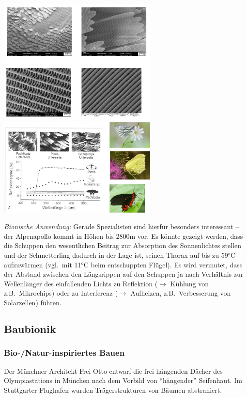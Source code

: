 \begin{center}
    \includegraphics[width=8cm]{lec7/figures/schmetterling.png}
    \hfill
    \includegraphics[width=8cm]{lec7/figures/absorption.png}
\end{center}
\textit{Bionische Anwendung:} Gerade Spezialisten sind hierfür besonders interessant -- der Alpenapollo kommt in Höhen bis 2800m vor. Es könnte gezeigt werden, dass die Schuppen den wesentlichen Beitrag zur Absorption des Sonnenlichtes stellen und der Schmetterling dadurch in der Lage ist, seinen Thorax auf bis zu 59°C aufzuwärmen (vgl.\ mit 11°C beim entschuppten Flügel). Es wird vermutet, dass der Abstand zwischen den Längsrippen auf den Schuppen ja nach Verhältnis zur Wellenlänger des einfallenden Lichts zu Reflektion ($\rightarrow$ Kühlung von z.B.\ Mikrochips) oder zu Interferenz ($\rightarrow$ Aufheizen, z.B.\ Verbesserung von Solarzellen) führen.

\subsection{Baubionik}

\subsubsection{Bio-/Natur-inspiriertes Bauen} 

Der Münchner Architekt Frei Otto entwarf die frei hängenden Dächer des Olympiastations in München nach dem Vorbild von ``hängender'' Seifenhaut. Im Stuttgarter Flughafen wurden Trägerstrukturen von Bäumen abstrahiert.

